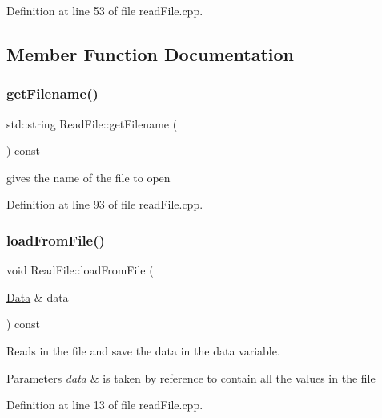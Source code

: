 Definition at line 53 of file read\+File.\+cpp.



\subsection{Member Function Documentation}
\mbox{\label{class_read_file_a494ba4e13b3619ff95bb0889f77b95aa}} 
\subsubsection{\texorpdfstring{get\+Filename()}{getFilename()}}
{\footnotesize\ttfamily std\+::string Read\+File\+::get\+Filename (\begin{DoxyParamCaption}{ }\end{DoxyParamCaption}) const}



gives the name of the file to open 



Definition at line 93 of file read\+File.\+cpp.

\mbox{\label{class_read_file_ad801fc147cb2522536db3da40735724b}} 
\subsubsection{\texorpdfstring{load\+From\+File()}{loadFromFile()}}
{\footnotesize\ttfamily void Read\+File\+::load\+From\+File (\begin{DoxyParamCaption}\item[{\mbox{\hyperlink{struct_data}{Data}} \&}]{data }\end{DoxyParamCaption}) const}



Reads in the file and save the data in the data variable. 


\begin{DoxyParams}{Parameters}
{\em data} & is taken by reference to contain all the values in the file \\
\hline
\end{DoxyParams}


Definition at line 13 of file read\+File.\+cpp.

